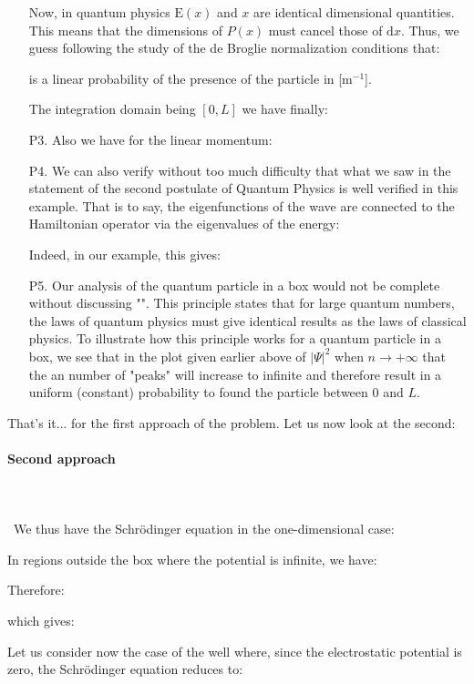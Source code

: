 \begin{enumerate}
		Now, in quantum physics $\text{E}(x)$ and $x$ are identical dimensional quantities. This means that the dimensions of $P(x)$ must cancel those of $\mathrm{d}x$. Thus, we guess following the study of the de Broglie normalization conditions that:
		
		is a linear probability of the presence of the particle in [m$ ^{-1}$].
		
		The integration domain being $[0, L]$ we have finally:
		
		
		\item[P3.] Also we have for the linear momentum:
		
		
		\item[P4.] We can also verify without too much difficulty that what we saw in the statement of the second postulate of Quantum Physics is well verified  in this example. That is to say, the eigenfunctions of the wave are connected to the Hamiltonian operator via the eigenvalues of the energy:
		
		Indeed, in our example, this gives:
		
		
		\item[P5.] Our analysis of the quantum particle in a box would not be complete without discussing "". This principle states that for large quantum numbers, the laws of quantum physics must give identical results as the laws of classical physics. To illustrate how this principle works for a quantum particle in a box, we see that in the plot given earlier above of $|\Psi|^2$ when $n\rightarrow +\infty$ that the an number of "peaks" will increase to infinite and therefore result in a uniform (constant) probability to found the particle between $0$ and $L$.
	\end{enumerate}
	That's it... for the first approach of the problem. Let us now look at the second:
	
	
	\paragraph{Second approach}\mbox{}\\\\\
	We thus have the Schrödinger equation in the one-dimensional case:
	
	In regions outside the box where the potential is infinite, we have:
	
	Therefore:
	
	which gives:
	
	Let us consider now the case of the well where, since the electrostatic potential is zero, the Schrödinger equation reduces to:
	
